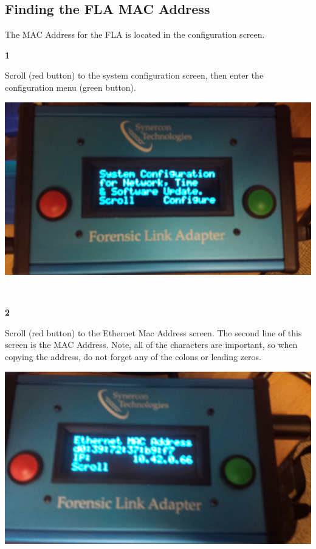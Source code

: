 \documentclass[11pt]{article}
\begin{document}
\subsection{Finding the FLA MAC Address}
\label{subsec:finding_mac}
The MAC Address for the FLA is located in the configuration screen.
\\[\baselineskip]
\noindent\begin{minipage}{0.3\textwidth}%
\begin{center}
\textbf{1}\\[\baselineskip]
\end{center}
Scroll (red button) to the system configuration screen, then enter the configuration menu (green button).
\end{minipage}%
\hfill%
\begin{minipage}{0.6\textwidth}
\includegraphics[width=\linewidth]{../media/fla_screens/sys_conf}
\end{minipage}
\\[\baselineskip]
\noindent\begin{minipage}{0.3\textwidth}%
\begin{center}
\textbf{2}\\[\baselineskip]
\end{center}
Scroll (red button) to the Ethernet Mac Address screen. The second line of this screen is the MAC Address. Note, all of the characters are important, so when copying the address, do not forget any of the colons or leading zeros.
\end{minipage}%
\hfill%
\begin{minipage}{0.6\textwidth}
\includegraphics[width=\linewidth]{../media/fla_screens/sys_conf_mac}
\end{minipage}
\\
\end{document}
